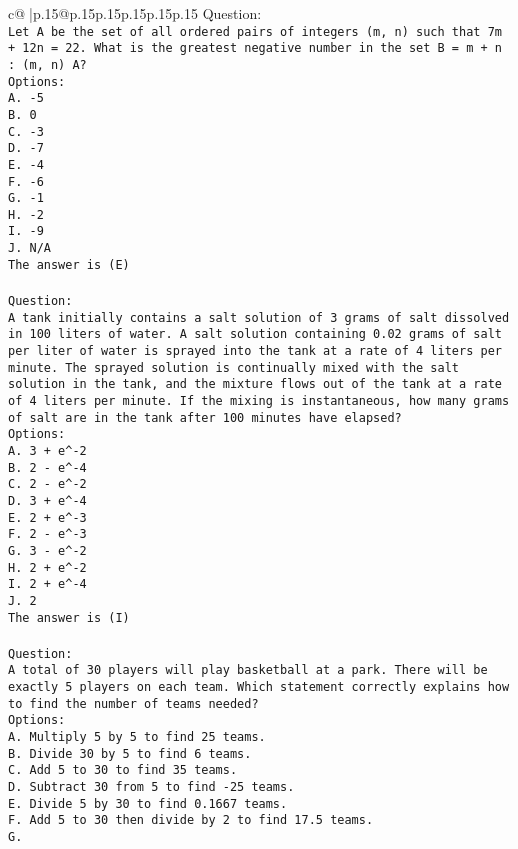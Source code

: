 \documentclass{article}
\begin{document}
{\begin{supertabular}{c@{$\;$}|p{.15\linewidth}@{}p{.15\linewidth}p{.15\linewidth}p{.15\linewidth}p{.15\linewidth}p{.15\linewidth}}
{{{Question:\\ \tt Let A be the set of all ordered pairs of integers (m, n) such that 7m + 12n = 22. What is the greatest negative number in the set B = {m + n : (m, n) \in A}?\\ \tt Options:\\ \tt A. -5\\ \tt B. 0\\ \tt C. -3\\ \tt D. -7\\ \tt E. -4\\ \tt F. -6\\ \tt G. -1\\ \tt H. -2\\ \tt I. -9\\ \tt J. N/A\\ \tt The answer is (E)\\ \tt \\ \tt Question:\\ \tt A tank initially contains a salt solution of 3 grams of salt dissolved in 100 liters of water. A salt solution containing 0.02 grams of salt per liter of water is sprayed into the tank at a rate of 4 liters per minute. The sprayed solution is continually mixed with the salt solution in the tank, and the mixture flows out of the tank at a rate of 4 liters per minute. If the mixing is instantaneous, how many grams of salt are in the tank after 100 minutes have elapsed?\\ \tt Options:\\ \tt A. 3 + e^-2\\ \tt B. 2 - e^-4\\ \tt C. 2 - e^-2\\ \tt D. 3 + e^-4\\ \tt E. 2 + e^-3\\ \tt F. 2 - e^-3\\ \tt G. 3 - e^-2\\ \tt H. 2 + e^-2\\ \tt I. 2 + e^-4\\ \tt J. 2\\ \tt The answer is (I)\\ \tt \\ \tt Question:\\ \tt A total of 30 players will play basketball at a park. There will be exactly 5 players on each team. Which statement correctly explains how to find the number of teams needed?\\ \tt Options:\\ \tt A. Multiply 5 by 5 to find 25 teams.\\ \tt B. Divide 30 by 5 to find 6 teams.\\ \tt C. Add 5 to 30 to find 35 teams.\\ \tt D. Subtract 30 from 5 to find -25 teams.\\ \tt E. Divide 5 by 30 to find 0.1667 teams.\\ \tt F. Add 5 to 30 then divide by 2 to find 17.5 teams.\\ \tt G. }}}
\end{supertabular}}
\end{document}
